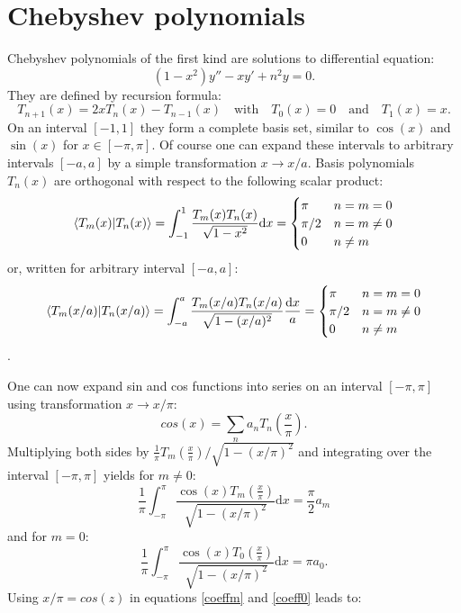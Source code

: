 \documentclass[openany, longbibliography,slovene,a4paper,12pt]{article}
\newcommand{\dif}{\mathrm{d}}
\begin{document}
\section*{Chebyshev polynomials}
Chebyshev polynomials of the first kind are solutions to differential equation:
\begin{equation}
  (1-x^2)y''-xy'+n^2y=0.
  \end{equation}
  They are defined by recursion formula:
  \begin{equation}
    T_{n+1}(x)=2xT_n(x)-T_{n-1}(x) \quad \mathrm{with} \quad T_0(x)=0 \quad\mathrm{and}\quad T_1(x)=x.
  \end{equation}
On an interval $[-1,1]$ they form a complete basis set, similar to $\cos(x)$ and
$\sin(x)$ for  $x\in[-\pi, \pi]$. Of course one can expand these intervals to
arbitrary intervals $[-a,a]$ by a simple transformation $x\rightarrow x/a$.
Basis polynomials $T_n(x)$ are orthogonal with respect to the following scalar
product:
\[
  \braket{T_m(x)|T_n(x)}=\int_{-1}^{1}\frac{T_m(x)T_n(x)}{\sqrt{1-x^2}}\dif x = \begin{cases}
                                   \pi & n=m=0  \\
                                   \pi/2 & n=m \neq 0\\
                                   0 & n \neq m \\
  \end{cases}
\]
or, written for arbitrary interval $[-a, a]$:
\[
  \braket{T_m(x/a)|T_n(x/a)}=\int_{-a}^{a}\frac{T_m(x/a)T_n(x/a)}{\sqrt{1-(x/a)^2}}
  \frac{\dif x}{a} = \begin{cases}
                                   \pi & n=m=0  \\
                                   \pi/2 & n=m \neq 0\\
                                   0 & n \neq m \\
  \end{cases}
\].

One can now expand sin and cos functions into series on an interval $[-\pi,
\pi]$ using transformation $x\rightarrow x/\pi$:
\begin{equation}
  cos(x)=\sum_na_nT_n\left(\frac{x}{\pi}\right).
  \end{equation}
Multiplying both sides by $\frac{1}{\pi}T_m(\frac{x}{\pi})/\sqrt{1-(x/\pi)^2}$ and
integrating over the interval $[-\pi, \pi]$ yields for $m\neq0$:
\begin{equation} \label{coeffm}
 \frac{1}{\pi}\int_{-\pi}^{\pi}\frac{\cos(x)T_m(\frac{x}{\pi})}{\sqrt{1-(x/\pi)^2}} \dif x = \frac{\pi}{2}a_m
\end{equation}
and for $m=0$:
\begin{equation}\label{coeff0}
 \frac{1}{\pi}\int_{-\pi}^{\pi}\frac{\cos(x)T_0(\frac{x}{\pi})}{\sqrt{1-(x/\pi)^2}} \dif x = \pi a_0.
\end{equation}
Using $x/\pi = cos(z)$  in equations \ref{coeffm} and  \ref{coeff0} leads to:
\end{document}
